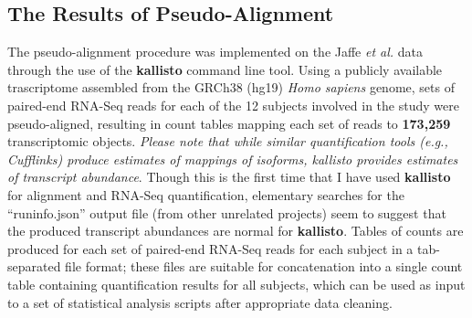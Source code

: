 \documentclass[paper=a4, fontsize=11pt]{scrartcl} %
\begin{document}
\subsection{The Results of Pseudo-Alignment}
The pseudo-alignment procedure was implemented on the Jaffe \textit{et al.} data
through the use of the \textbf{kallisto} command line tool. Using a publicly
available trascriptome assembled from the GRCh38 (hg19) \textit{Homo sapiens}
genome, sets of paired-end RNA-Seq reads for each of the 12 subjects involved in
the study were pseudo-aligned, resulting in count tables mapping each set of
reads to \textbf{173,259} transcriptomic objects. \textit{Please note that while
similar quantification tools (e.g., Cufflinks) produce estimates of mappings of
isoforms, kallisto provides estimates of transcript abundance}. Though this is
the first time that I have used \textbf{kallisto} for alignment and RNA-Seq
quantification, elementary searches for the ``run\textunderscore info.json''
output file (from other unrelated projects) seem to suggest that the produced
transcript abundances are normal for \textbf{kallisto}. Tables of counts are
produced for each set of paired-end RNA-Seq reads for each subject in a
tab-separated file format; these files are suitable for concatenation into a
single count table containing quantification results for all subjects, which can
be used as input to a set of statistical analysis scripts after appropriate data
cleaning.
\end{document}
